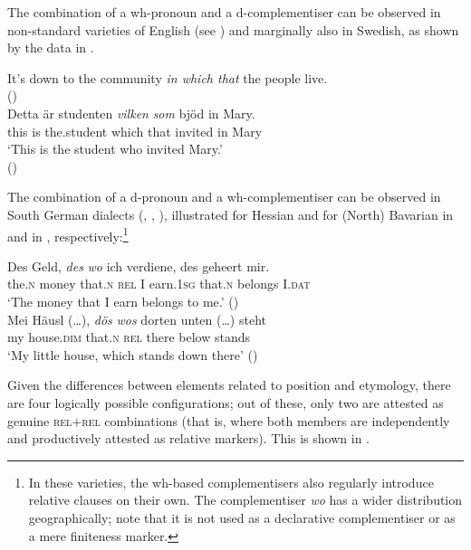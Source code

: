 \documentclass[output=paper]{langscibook}
\begin{document}
The combination of a wh-pronoun and a d-complementiser can be observed in non-standard varieties of English (see \citealt{vangelderen2009}) and marginally also in Swedish, as shown by the data in .

\ea \label{bacsk:ex:engswe}
\ea It's down to the community \textit{in which that} the people live. \label{bacsk:ex:inwhichthat}\\\hfill (\citealt[59]{vangelderen2013})\\
\ex \gll Detta	är studenten \textit{vilken} \textit{som} bjöd in	Mary.\\
this is	the.student	which that invited in	Mary\\
\glt `This is the student who invited Mary.'\\\hfill (\citealt[247]{bacskaiatkaribaudisch2018})
\z
\z

\noindent The combination of a d-pronoun and a wh-complementiser can be observed in South German dialects (\citealt{brandnerbraeuning2013}, \citealt{weiss2013}, \citealt{fleischer2017}), illustrated for Hessian and for (North) Bavarian in  and in , respectively:\footnote{In these varieties, the wh-based complementisers also regularly introduce relative clauses on their own. The complementiser \textit{wo} has a wider distribution geographically; note that it is not used as a declarative complementiser or as a mere finiteness marker.}

\ea
\ea \gll Des Geld, \textit{des} \textit{wo} ich verdiene, des geheert mir. \label{bacsk:ex:hessian}\\
the.\textsc{n} money that.\textsc{n} \textsc{rel} I earn.\textsc{1sg} that.\textsc{n} belongs I.\textsc{dat}\\
\glt `The money that I earn belongs to me.' \hfill (\citealt{fleischer2017})\\
\ex \gll Mei Häusl (\ldots), \textit{dös} \textit{wos} dorten unten (\ldots) steht \label{bacsk:ex:dfcbavarian}\\
my house.\textsc{dim} {} that.\textsc{n} \textsc{rel} there below {} stands\\
\glt `My little house, which stands down there' \hfill (\citealt[780]{weiss2013})
\z
\z

\noindent Given the differences between elements related to position and etymology, there are four logically possible configurations; out of these, only two are attested as genuine \textsc{rel}$+$\textsc{rel} combinations (that is, where both members are independently and productively attested as relative markers). This is shown in .
\end{document}
